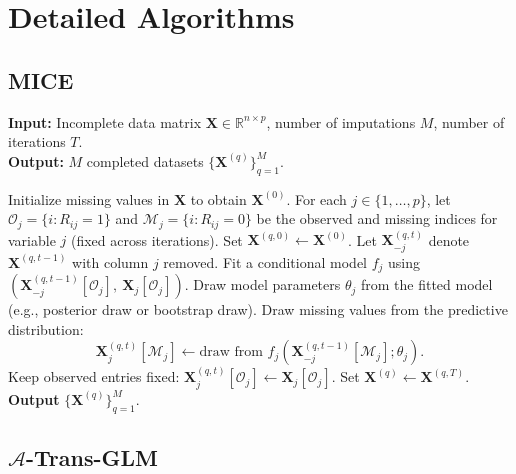 \setcounter{page}{1}
\setcounter{section}{0}
\renewcommand{\thesection}{S.\arabic{section}}
\renewcommand{\thesubsection}{S.\arabic{section}.\arabic{subsection}}
\setcounter{figure}{0}
\renewcommand{\thefigure}{S.\arabic{figure}}
\setcounter{table}{0}
\renewcommand{\thetable}{S.\arabic{table}}

\section{Detailed Algorithms}
\subsection{MICE}
\begin{algorithm}[H]
\footnotesize
\caption{Multiple Imputation by Chained Equations (MICE)}
\label{alg:mice}
\textbf{Input:} Incomplete data matrix $\bm{X}\in\mathbb{R}^{n\times p}$, number of imputations $M$, number of iterations $T$.\\
\textbf{Output:} $M$ completed datasets $\{\bm{X}^{(q)}\}_{q=1}^M$.
\begin{algorithmic}[1]
\State Initialize missing values in $\bm{X}$ to obtain $\bm{X}^{(0)}$.
\State For each $j\in\{1,\dots,p\}$, let $\mathcal{O}_j=\{i:R_{ij}=1\}$ and $\mathcal{M}_j=\{i:R_{ij}=0\}$ be the observed and missing indices for variable $j$ (fixed across iterations).
  \State Set $\bm{X}^{(q,0)}\leftarrow \bm{X}^{(0)}$.
      \State Let $\bm{X}^{(q,t)}_{-j}$ denote $\bm{X}^{(q,t-1)}$ with column $j$ removed.
      \State Fit a conditional model $f_j$ using $(\bm{X}^{(q,t-1)}_{-j}[\mathcal{O}_j],\ \bm{X}_j[\mathcal{O}_j])$.
      \State Draw model parameters $\theta_j$ from the fitted model (e.g., posterior draw or bootstrap draw).
      \State Draw missing values from the predictive distribution:
      \[
        \bm{X}^{(q,t)}_j[\mathcal{M}_j]\leftarrow \text{draw from } f_j\!\left(\bm{X}^{(q,t-1)}_{-j}[\mathcal{M}_j];\theta_j\right).
      \]
      \State Keep observed entries fixed: $\bm{X}^{(q,t)}_j[\mathcal{O}_j]\leftarrow \bm{X}_j[\mathcal{O}_j]$.
    \EndFor
  \EndFor
  \State Set $\bm{X}^{(q)}\leftarrow \bm{X}^{(q,T)}$.
\EndFor
\State \textbf{Output} $\{\bm{X}^{(q)}\}_{q=1}^M$.
\end{algorithmic}
\end{algorithm}

\subsection{$\mathcal{A}$-Trans-GLM}

